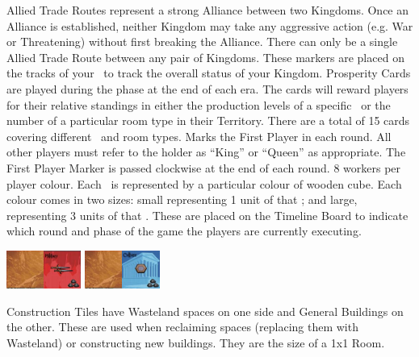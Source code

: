 \documentclass[10pt,twocolumn]{article}
\begin{document}
Allied Trade Routes represent a strong Alliance between two Kingdoms. Once an Alliance is established, neither Kingdom may take any aggressive action (e.g. War or Threatening) without first breaking the Alliance. There can only be a single Allied Trade Route between any pair of Kingdoms.
These markers are placed on the tracks of your \psb\ to track the overall status of your Kingdom.
Prosperity Cards are played during the  phase at the end of each era. The cards will reward players for their relative standings in either the production levels of a specific \good\ or the number of a particular room type in their Territory. There are a total of 15 cards covering different \goods\ and room types.
Marks the First Player in each round. All other players must refer to the holder as ``King'' or ``Queen'' as appropriate. The First Player Marker is passed clockwise at the end of each round.
8 workers per player colour.
Each \good\ is represented by a particular colour of wooden cube. Each colour comes in two sizes: small representing 1 unit of that \good; and large, representing 3 units of that \good.
These are placed on the Timeline Board to indicate which round and phase of the game the players are currently executing.
\centerline{\includegraphics[height=1.25cm]{CT1}\includegraphics[height=1.25cm]{CT2}  \includegraphics[height=1.25cm]{CT3}\includegraphics[height=1.25cm]{CT4}}
Construction Tiles have Wasteland spaces on one side and General Buildings on the other. These are used when reclaiming spaces (replacing them with Wasteland) or constructing new buildings. They are the size of a 1x1 Room.
\end{document}

